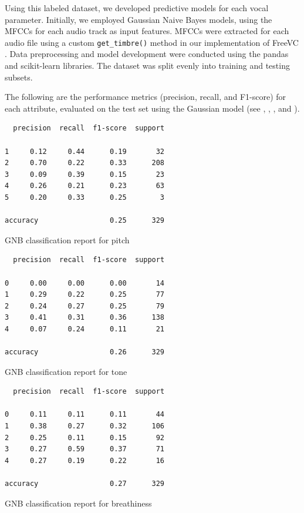 \documentclass{article}
\begin{document}
Using this labeled dataset, we developed predictive models for each vocal parameter. Initially, we employed Gaussian Naive Bayes models, using the MFCCs for each audio track as input features. MFCCs were extracted for each audio file using a custom \texttt{get\_timbre()} method in our implementation of FreeVC \cite{Li22}. Data preprocessing and model development were conducted using the pandas \cite{Pandas} and scikit-learn \cite{Sklearn} libraries. The dataset was split evenly into training and testing subsets.

The following are the performance metrics (precision, recall, and F1-score) for each attribute, evaluated on the test set using the Gaussian model (see , , , and ).

\begin{table}
\begin{verbatim}
  precision  recall  f1-score  support

1     0.12     0.44      0.19       32
2     0.70     0.22      0.33      208
3     0.09     0.39      0.15       23
4     0.26     0.21      0.23       63
5     0.20     0.33      0.25        3

accuracy                 0.25      329
\end{verbatim}
\caption{GNB classification report for pitch}
\label{tab:gpitch}
\end{table}

\begin{table}
\begin{verbatim}
  precision  recall  f1-score  support

0     0.00     0.00      0.00       14
1     0.29     0.22      0.25       77
2     0.24     0.27      0.25       79
3     0.41     0.31      0.36      138
4     0.07     0.24      0.11       21

accuracy                 0.26      329
\end{verbatim}
\caption{GNB classification report for tone}
\label{tab:gtone}
\end{table}

\begin{table}
\begin{verbatim}
  precision  recall  f1-score  support

0     0.11     0.11      0.11       44
1     0.38     0.27      0.32      106
2     0.25     0.11      0.15       92
3     0.27     0.59      0.37       71
4     0.27     0.19      0.22       16

accuracy                 0.27      329
\end{verbatim}
\caption{GNB classification report for breathiness}
\label{tab:gbreath}
\end{table}
\end{document}
